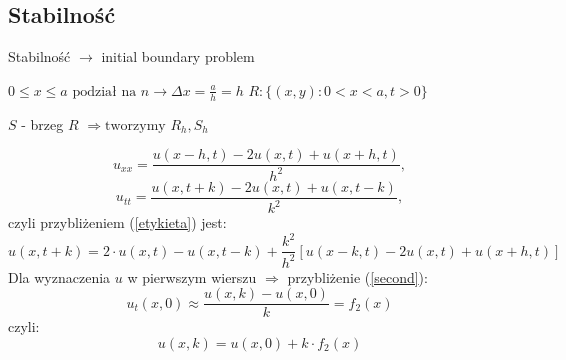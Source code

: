 
\subsection{Stabilność}
\begin{frame}{Stabilność}
$\to$ initial boundary problem

  \begin{block}{}
$0 \le x \le a \text{ podział na } n \to \Delta x = \frac{a}{h} = h$
$R: \{ (x,y): 0 < x< a, t > 0\}$
  \end{block}
$S$ - brzeg $R$
$\Rightarrow \text{tworzymy } R_h, S_h$


\end{frame}

\begin{frame}
$$u_{xx} = \frac{u(x-h,t)-2u(x,t)+u(x+h,t)}{h^2},$$
$$u_{tt} = \frac{u(x,t+k)-2u(x,t)+u(x,t-k)}{k^2},$$
czyli przybliżeniem (\ref{etykieta}) jest: \\
\begin{equation} \label{21} u(x,t+k) = 2\cdot u(x,t) - u(x,t-k) + \frac{k^2}{h^2}[u(x-k,t)-2u(x,t)+u(x+h,t)] \end{equation}
Dla wyznaczenia $u$ w pierwszym wierszu $\Rightarrow$ przybliżenie (\ref{second}):
$$u_t(x,0) \approx \frac{u(x,k) - u(x,0)}{k} = f_2(x)$$
czyli:
\begin{equation} \label{22} u(x,k) = u(x,0) + k \cdot f_2(x) \end{equation}
\end{frame}

